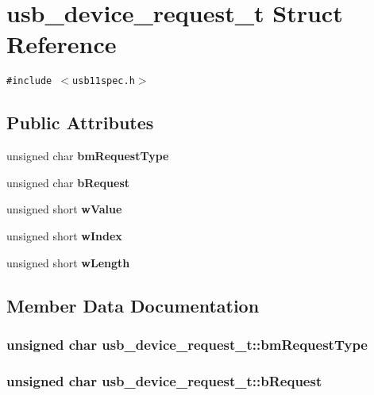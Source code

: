 \section{usb\_\-device\_\-request\_\-t Struct Reference}
\label{structusb__device__request__t}
{\tt \#include $<$usb11spec.h$>$}

\subsection*{Public Attributes}
\begin{CompactItemize}
\item 
unsigned char {\bf bm\-Request\-Type}
\item 
unsigned char {\bf b\-Request}
\item 
unsigned short {\bf w\-Value}
\item 
unsigned short {\bf w\-Index}
\item 
unsigned short {\bf w\-Length}
\end{CompactItemize}


\subsection{Member Data Documentation}
\subsubsection{\setlength{\rightskip}{0pt plus 5cm}unsigned char {\bf usb\_\-device\_\-request\_\-t::bm\-Request\-Type}}\label{structusb__device__request__t_dd94ec220787c29768bbcad077a3fc21}


\subsubsection{\setlength{\rightskip}{0pt plus 5cm}unsigned char {\bf usb\_\-device\_\-request\_\-t::b\-Request}}\label{structusb__device__request__t_05036746f57368bfb2d24c9464f21c82}


